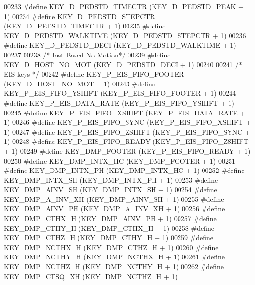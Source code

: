 \begin{DoxyCode}
00233 \textcolor{preprocessor}{#define KEY\_D\_PEDSTD\_TIMECTR        (KEY\_D\_PEDSTD\_PEAK + 1)}
00234 \textcolor{preprocessor}{#define KEY\_D\_PEDSTD\_STEPCTR        (KEY\_D\_PEDSTD\_TIMECTR + 1)}
00235 \textcolor{preprocessor}{#define KEY\_D\_PEDSTD\_WALKTIME       (KEY\_D\_PEDSTD\_STEPCTR + 1)}
00236 \textcolor{preprocessor}{#define KEY\_D\_PEDSTD\_DECI           (KEY\_D\_PEDSTD\_WALKTIME + 1)}
00237 
00238 \textcolor{comment}{/*Host Based No Motion*/}
00239 \textcolor{preprocessor}{#define KEY\_D\_HOST\_NO\_MOT           (KEY\_D\_PEDSTD\_DECI + 1)}
00240 
00241 \textcolor{comment}{/* EIS keys */}
00242 \textcolor{preprocessor}{#define KEY\_P\_EIS\_FIFO\_FOOTER       (KEY\_D\_HOST\_NO\_MOT + 1)}
00243 \textcolor{preprocessor}{#define KEY\_P\_EIS\_FIFO\_YSHIFT       (KEY\_P\_EIS\_FIFO\_FOOTER + 1)}
00244 \textcolor{preprocessor}{#define KEY\_P\_EIS\_DATA\_RATE         (KEY\_P\_EIS\_FIFO\_YSHIFT + 1)}
00245 \textcolor{preprocessor}{#define KEY\_P\_EIS\_FIFO\_XSHIFT       (KEY\_P\_EIS\_DATA\_RATE + 1)}
00246 \textcolor{preprocessor}{#define KEY\_P\_EIS\_FIFO\_SYNC         (KEY\_P\_EIS\_FIFO\_XSHIFT + 1)}
00247 \textcolor{preprocessor}{#define KEY\_P\_EIS\_FIFO\_ZSHIFT       (KEY\_P\_EIS\_FIFO\_SYNC + 1)}
00248 \textcolor{preprocessor}{#define KEY\_P\_EIS\_FIFO\_READY        (KEY\_P\_EIS\_FIFO\_ZSHIFT + 1)}
00249 \textcolor{preprocessor}{#define KEY\_DMP\_FOOTER              (KEY\_P\_EIS\_FIFO\_READY + 1)}
00250 \textcolor{preprocessor}{#define KEY\_DMP\_INTX\_HC             (KEY\_DMP\_FOOTER + 1)}
00251 \textcolor{preprocessor}{#define KEY\_DMP\_INTX\_PH             (KEY\_DMP\_INTX\_HC + 1)}
00252 \textcolor{preprocessor}{#define KEY\_DMP\_INTX\_SH             (KEY\_DMP\_INTX\_PH + 1)}
00253 \textcolor{preprocessor}{#define KEY\_DMP\_AINV\_SH             (KEY\_DMP\_INTX\_SH + 1)}
00254 \textcolor{preprocessor}{#define KEY\_DMP\_A\_INV\_XH            (KEY\_DMP\_AINV\_SH + 1)}
00255 \textcolor{preprocessor}{#define KEY\_DMP\_AINV\_PH             (KEY\_DMP\_A\_INV\_XH + 1)}
00256 \textcolor{preprocessor}{#define KEY\_DMP\_CTHX\_H              (KEY\_DMP\_AINV\_PH + 1)}
00257 \textcolor{preprocessor}{#define KEY\_DMP\_CTHY\_H              (KEY\_DMP\_CTHX\_H + 1)}
00258 \textcolor{preprocessor}{#define KEY\_DMP\_CTHZ\_H              (KEY\_DMP\_CTHY\_H + 1)}
00259 \textcolor{preprocessor}{#define KEY\_DMP\_NCTHX\_H             (KEY\_DMP\_CTHZ\_H + 1)}
00260 \textcolor{preprocessor}{#define KEY\_DMP\_NCTHY\_H             (KEY\_DMP\_NCTHX\_H + 1)}
00261 \textcolor{preprocessor}{#define KEY\_DMP\_NCTHZ\_H             (KEY\_DMP\_NCTHY\_H + 1)}
00262 \textcolor{preprocessor}{#define KEY\_DMP\_CTSQ\_XH             (KEY\_DMP\_NCTHZ\_H + 1)}

\end{DoxyCode}
